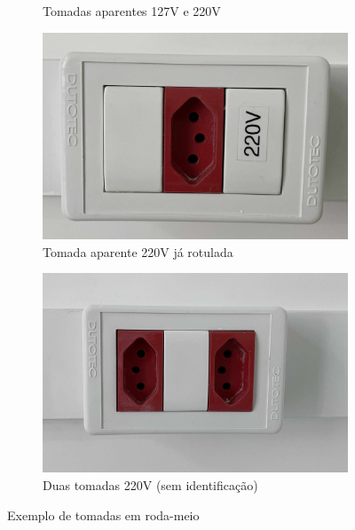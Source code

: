 \begin{enumerate}
\begin{figure}[H]
\begin{subfigure}[b]{0.23\textwidth}
				\caption{Tomadas aparentes 127V e 220V}
				\label{fig: style 2 image b}
			\end{subfigure}
			\hfill
			\begin{subfigure}[b]{0.23\textwidth}
				\centering
				\includegraphics[width=\textwidth]{Figures/4. Socket/tomada4.jpg}
				\caption{Tomada aparente 220V já rotulada}
				\label{fig: style 2 image c}
			\end{subfigure}
			\hfill
			\begin{subfigure}[b]{0.23\textwidth}
				\centering
				\includegraphics[width=\textwidth]{Figures/4. Socket/tomada5.jpg}
				\caption{Duas tomadas 220V (sem identificação)}
				\label{fig: style 2 image d}
			\end{subfigure}
		\caption{Exemplo de tomadas em roda-meio}
		\label{fig: exemplo-rodameio}
	\end{figure}
	

\end{enumerate}
